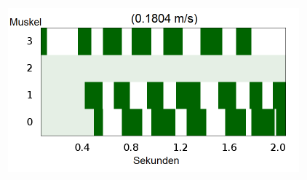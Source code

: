 \documentclass{beamer}
\begin{document}
\begin{frame}
\begin{columns}
\begin{figure}
		\end{figure}
		\begin{figure}
			\includegraphics[width=0.9\textwidth]{img/hum26.png}
		\end{figure}
	\end{columns}
\end{frame}
\end{document}

